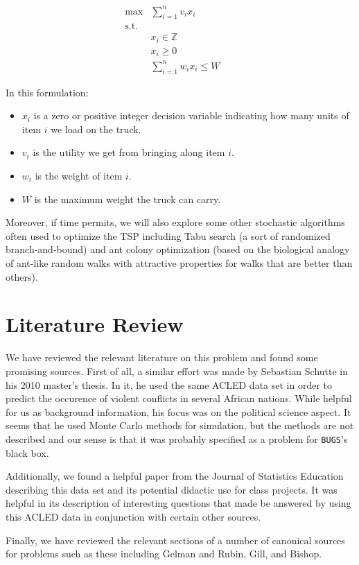 \documentclass{article} %
\begin{document}
\begin{align*}
\max &\sum_{i=1}^n v_i x_i &&  \\
\mathrm{s.t.} & \\
    & x_i \in \mathbb{Z} \\
    & x_i \geq 0 \\
	& \sum_{i=1}^n w_ix_i \leq W
\end{align*}

In this formulation:

\begin{itemize}
  \item $x_{i}$ is a zero or positive integer decision variable indicating how many units of item $i$
        we load on the truck.
  \item $v_i$ is the utility we get from bringing along item $i$.
  \item $w_i$ is the weight of item $i$.
  \item $W$ is the maximum weight the truck can carry.
\end{itemize}

Moreover, if time permits, we will also explore some other stochastic algorithms often used to
optimize the TSP including Tabu search (a sort of randomized branch-and-bound) and ant colony
optimization (based on the biological analogy of ant-like random walks with attractive
properties for walks that are better than others).


\section*{Literature Review}

We have reviewed the relevant literature on this problem and found some promising sources. First of
all, a similar effort was made by Sebastian Schutte in his 2010 master's thesis. In it, he used the same ACLED data set in order to predict the occurence of violent conflicts in several African nations. While helpful for us as background information, his focus was on the political science aspect. It seems that he used Monte Carlo methods for simulation, but the methods are not described and our sense is that it was probably specified as a problem for \verb+BUGS+'s black box.

Additionally, we found a helpful paper from the Journal of Statistics Education describing this data set and its potential didactic use for class projects. It was helpful in its description of interesting questions that made be answered by using this ACLED data in conjunction with certain other sources.

Finally, we have reviewed the relevant sections of a number of canonical sources for problems such as these including Gelman and Rubin, Gill, and Bishop.

% 
\end{document}
